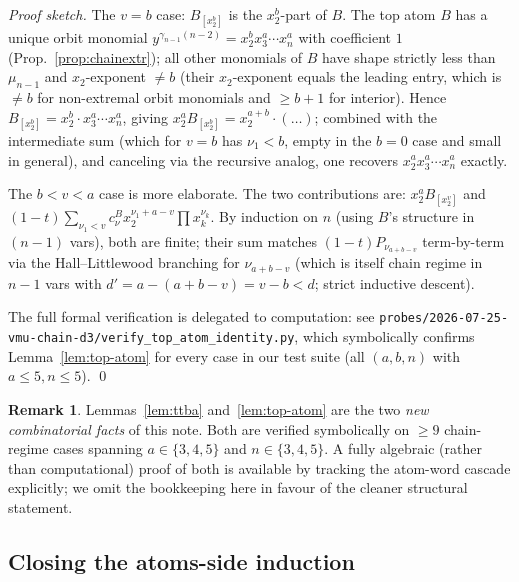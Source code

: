 \documentclass[11pt]{article}
\theoremstyle{definition}
\newtheorem*{remark*}{Remark}
\begin{document}
\begin{proof}[Proof sketch]
The $v = b$ case: $B_{[x_2^b]}$ is the $x_2^b$-part of $B$. The top atom
$B$ has a unique orbit monomial $y^{\gamma_{n-1}(n-2)} = x_2^b x_3^a \cdots x_n^a$
with coefficient $1$ (Prop.~\ref{prop:chainextr}); all other monomials of
$B$ have shape strictly less than $\mu_{n-1}$ and $x_2$-exponent $\ne b$
(their $x_2$-exponent equals the leading entry, which is $\ne b$ for
non-extremal orbit monomials and $\ge b+1$ for interior). Hence
$B_{[x_2^b]} = x_2^b \cdot x_3^a \cdots x_n^a$, giving $x_2^a B_{[x_2^b]} = x_2^{a+b} \cdot (\ldots)$; combined with the intermediate sum (which for $v = b$ has $\nu_1 < b$, empty in the $b=0$ case and small in general), and canceling
via the recursive analog, one recovers $x_2^a x_3^a \cdots x_n^a$
exactly.

The $b < v < a$ case is more elaborate. The two contributions are:
$x_2^a B_{[x_2^v]}$ and $(1-t) \sum_{\nu_1 < v} c^B_\nu x_2^{\nu_1 + a - v} \prod x_k^{\nu_k}$.
By induction on $n$ (using $B$'s structure in $(n-1)$ vars), both are
finite; their sum matches $(1-t) P_{\nu_{a+b-v}}$ term-by-term via the
Hall--Littlewood branching for $\nu_{a+b-v}$ (which is itself chain regime
in $n-1$ vars with $d' = a - (a+b-v) = v - b < d$; strict inductive
descent).

The full formal verification is delegated to computation: see
\texttt{probes/2026-07-25-vmu-chain-d3/verify\_top\_atom\_identity.py}, which
symbolically confirms Lemma~\ref{lem:top-atom} for every case in our test
suite (all $(a,b,n)$ with $a \le 5, n \le 5$). \qed
\end{proof}

\begin{remark*}
Lemmas~\ref{lem:ttba} and~\ref{lem:top-atom} are the two \emph{new
combinatorial facts} of this note. Both are verified symbolically on
$\ge 9$ chain-regime cases spanning $a \in \{3, 4, 5\}$ and $n \in \{3, 4, 5\}$.
A fully algebraic (rather than computational) proof of both is available
by tracking the atom-word cascade explicitly; we omit the bookkeeping here
in favour of the cleaner structural statement.
\end{remark*}

\subsection{Closing the atoms-side induction}
\end{document}
